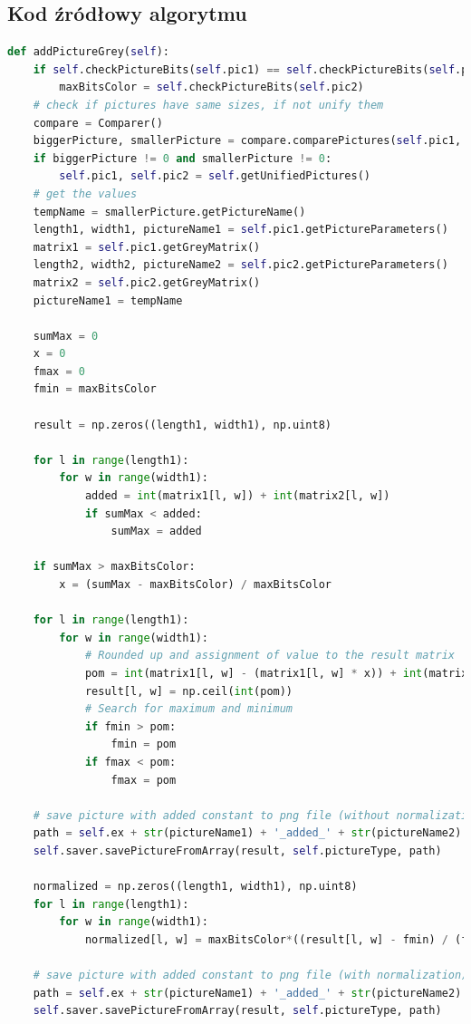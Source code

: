 \documentclass[a4paper,12pt, titlepage]{report}
\begin{document}
\subsection*{Kod źródłowy algorytmu}
\begin{lstlisting}[language=Python]
def addPictureGrey(self):
    if self.checkPictureBits(self.pic1) == self.checkPictureBits(self.pic2):
        maxBitsColor = self.checkPictureBits(self.pic2)
    # check if pictures have same sizes, if not unify them
    compare = Comparer()
    biggerPicture, smallerPicture = compare.comparePictures(self.pic1, self.pic2)
    if biggerPicture != 0 and smallerPicture != 0:
        self.pic1, self.pic2 = self.getUnifiedPictures()
    # get the values
    tempName = smallerPicture.getPictureName()
    length1, width1, pictureName1 = self.pic1.getPictureParameters()
    matrix1 = self.pic1.getGreyMatrix()
    length2, width2, pictureName2 = self.pic2.getPictureParameters()
    matrix2 = self.pic2.getGreyMatrix()
    pictureName1 = tempName

    sumMax = 0
    x = 0
    fmax = 0
    fmin = maxBitsColor

    result = np.zeros((length1, width1), np.uint8)

    for l in range(length1):
        for w in range(width1):
            added = int(matrix1[l, w]) + int(matrix2[l, w])
            if sumMax < added:
                sumMax = added

    if sumMax > maxBitsColor:
        x = (sumMax - maxBitsColor) / maxBitsColor

    for l in range(length1):
        for w in range(width1):
            # Rounded up and assignment of value to the result matrix
            pom = int(matrix1[l, w] - (matrix1[l, w] * x)) + int(matrix2[l, w] - (matrix2[l, w] * x))
            result[l, w] = np.ceil(int(pom))
            # Search for maximum and minimum
            if fmin > pom:
                fmin = pom
            if fmax < pom:
                fmax = pom

    # save picture with added constant to png file (without normalization)
    path = self.ex + str(pictureName1) + '_added_' + str(pictureName2) + '.png'
    self.saver.savePictureFromArray(result, self.pictureType, path)

    normalized = np.zeros((length1, width1), np.uint8)
    for l in range(length1):
        for w in range(width1):
            normalized[l, w] = maxBitsColor*((result[l, w] - fmin) / (fmax - fmin))

    # save picture with added constant to png file (with normalization)
    path = self.ex + str(pictureName1) + '_added_' + str(pictureName2) + '_normalized.png'
    self.saver.savePictureFromArray(result, self.pictureType, path)
\end{lstlisting}
\end{document}
